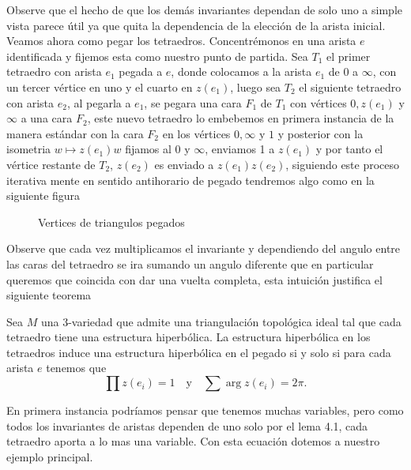 Observe que el hecho de que los demás invariantes dependan de solo uno a simple vista parece útil ya que quita la dependencia de la elección de la arista inicial. Veamos ahora como pegar los tetraedros. Concentrémonos en una arista $e$ identificada y fijemos esta como nuestro punto de partida. Sea $T_1$ el primer tetraedro con arista $e_1$ pegada a $e$, donde colocamos a la arista $e_1$ de $0$ a $\infty$, con un tercer vértice en uno y el cuarto en $z(e_1)$, luego sea $T_2$ el siguiente tetraedro con arista $e_2$, al pegarla a $e_1$, se pegara una cara $F_1$ de $T_1$ con vértices $0,z(e_1)$ y $\infty$ a una cara $F_2$, este nuevo tetraedro lo embebemos en primera instancia de la manera estándar con la cara $F_2$ en los vértices $0,\infty$ y $1$ y posterior con la isometria $w\mapsto z(e_1)w$ fijamos al $0$ y $\infty$, enviamos 1 a $z(e_1)$ y por tanto el vértice restante de $T_2$, $z(e_2)$ es enviado a $z(e_1)z(e_2)$, siguiendo este proceso iterativa mente en sentido antihorario de pegado tendremos algo como en la siguiente figura
\begin{figure}[H]
\centering

    \caption{Vertices de triangulos pegados}
\end{figure}
Observe que cada vez multiplicamos el invariante y dependiendo del angulo entre las caras del tetraedro se ira sumando un angulo diferente que en particular queremos que coincida con dar una vuelta completa, esta intuición justifica el siguiente teorema
\begin{theorem}
    Sea $M$ una 3-variedad que admite una triangulación topológica ideal tal que cada tetraedro tiene una estructura hiperbólica. La estructura hiperbólica en los tetraedros induce una estructura hiperbólica en el pegado si y solo si para cada arista $e$ tenemos que 
    $$\prod z(e_i)=1\quad\text{y}\quad\sum\arg z(e_i)=2\pi.$$
\end{theorem}
En primera instancia podríamos pensar que tenemos muchas variables, pero como todos los invariantes de aristas dependen de uno solo por el lema 4.1, cada tetraedro aporta a lo mas una variable. Con esta ecuación dotemos a nuestro ejemplo principal.
